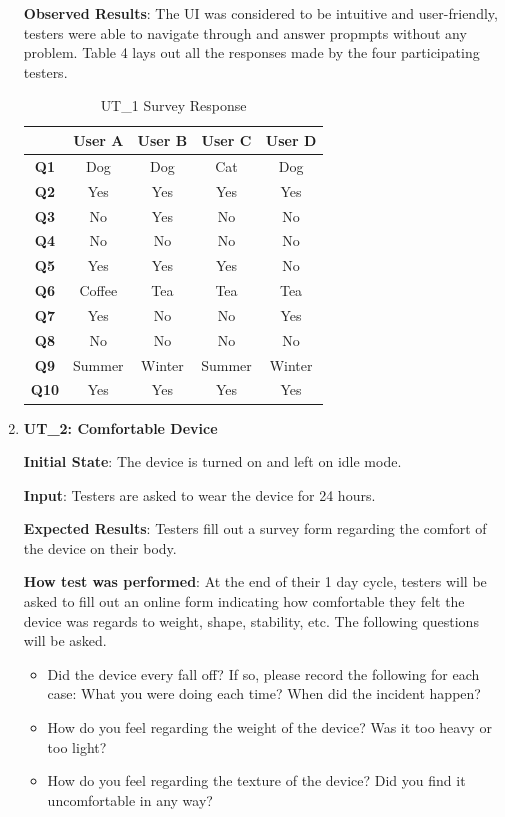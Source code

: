 \documentclass[12pt, titlepage]{article}
\begin{document}
\begin{enumerate}
  \textbf{Observed Results}: The UI was considered to be intuitive and user-friendly, testers were able to navigate through and answer propmpts without any problem. Table 4 lays out all the responses made by the four participating testers.

\begin{table}[H]
\centering
\caption{UT\_1 Survey Response}
  \begin{tabular}{| c| c | c | c | c |}
\hline
    \textbf{} & \textbf{User A} & \textbf{User B} & \textbf{User C} & \textbf{User D}\\
\hline
\textbf{Q1} & Dog & Dog & Cat & Dog \\
\hline
\textbf{Q2} & Yes & Yes & Yes & Yes \\
\hline
\textbf{Q3} & No & Yes & No & No \\
\hline
\textbf{Q4} & No & No & No & No \\
\hline
\textbf{Q5} & Yes & Yes & Yes & No \\
\hline
\textbf{Q6} & Coffee & Tea & Tea & Tea\\
\hline
\textbf{Q7} & Yes & No & No & Yes \\
\hline
\textbf{Q8} & No & No & No & No \\
\hline
\textbf{Q9} & Summer & Winter & Summer & Winter \\
\hline
\textbf{Q10} & Yes & Yes & Yes & Yes \\
\hline
  \end{tabular}
\end{table}

  \item\textbf{{UT\_2: Comfortable Device\\}}\label{UT2}

  \textbf{Initial State}: The device is turned on and left on idle mode.

  \textbf{Input}: Testers are asked to wear the device for 24 hours.

  \textbf{Expected Results}: Testers fill out a survey form regarding the comfort of the device on their body.

  \textbf{How test was performed}: At the end of their 1 day cycle, testers will be asked to fill out an online form indicating how comfortable they felt the device was regards to weight, shape, stability, etc. The following questions will be asked.

  \begin{itemize}
    \item Did the device every fall off? If so, please record the following for each case: What you were doing each time? When did the incident happen?
    \item How do you feel regarding the weight of the device? Was it too heavy or too light?
    \item How do you feel regarding the texture of the device? Did you find it uncomfortable in any way?
  \end{itemize}


\end{enumerate}
\end{document}

